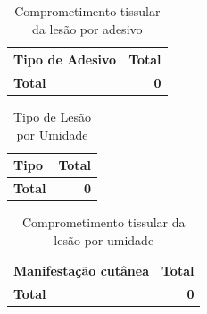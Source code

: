 \documentclass[
  a4paper]{article}
\begin{document}
\begin{table}[H]

\caption{\label{tab:unnamed-chunk-29}Tipo de Lesão de Pele}
\centering
{}
\end{table}

\begin{table}[H]

\caption{\label{tab:unnamed-chunk-30}Comprometimento tissular da lesão por adesivo}
\centering
\begin{tabular}[t]{lr}
\toprule
Tipo de Adesivo & Total\\
\midrule
\midrule
\textbf{Total} & \textbf{0}\\
\bottomrule
\end{tabular}
\end{table}

\begin{table}[H]

\caption{\label{tab:unnamed-chunk-31}Tipo de Lesão por Umidade}
\centering
\begin{tabular}[t]{lr}
\toprule
Tipo & Total\\
\midrule
\midrule
\textbf{Total} & \textbf{0}\\
\bottomrule
\end{tabular}
\end{table}

\begin{table}[H]

\caption{\label{tab:unnamed-chunk-32}Comprometimento tissular da lesão por umidade}
\centering
\begin{tabular}[t]{lr}
\toprule
Manifestação cutânea & Total\\
\midrule
\midrule
\textbf{Total} & \textbf{0}\\
\bottomrule
\end{tabular}
\end{table}
\end{document}
